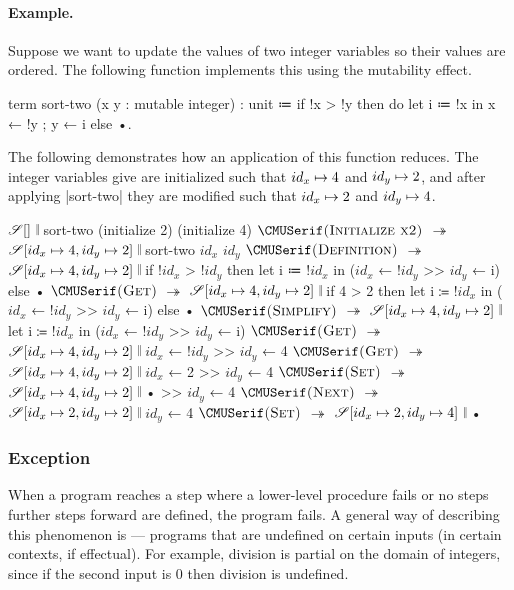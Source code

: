 \paragraph{Example.}
Suppose we want to update the values of two integer variables so their values are ordered.
The following function implements this using the mutability effect.
%
\begin{snippet}
term sort-two (x y : mutable integer) : unit
  ≔ if !x > !y
      then do
        { let i ≔ !x in
          x ← !y
        ; y ← i  }
      else •.
\end{snippet}
%
The following demonstrates how an application of this function reduces.
The integer variables give are initialized such that $id_x \mapsto 4$ and $id_y \mapsto 2$, and after applying \code|sort-two| they are modified such that $id_x \mapsto 2$ and $id_y \mapsto 4$.
%
\begin{snippet}
$\mathscr{S}[]$ 𝄁 sort-two (initialize 2) (initialize 4)
$\ruleapp{Initialize x2}$
$↠$ $\mathscr{S}[id_x \mapsto 4, id_y \mapsto 2]$ 𝄁 sort-two $id_x$ $id_y$
$\ruleapp{Definition}$
$↠$ $\mathscr{S}[id_x \mapsto 4, id_y \mapsto 2]$ 𝄁 if !$id_x$ > !$id_y$
                        then let i ≔ !$id_x$ in ($id_x$ ← !$id_y$ >> $id_y$ ← i)
                        else •
$\ruleapp{Get}$
$↠$ $\mathscr{S}[id_x \mapsto 4, id_y \mapsto 2]$ 𝄁 if 4 > 2
                        then let i ≔ !$id_x$ in ($id_x$ ← !$id_y$ >> $id_y$ ← i)
                        else •
$\ruleapp{Simplify}$
$↠$ $\mathscr{S}[id_x \mapsto 4, id_y \mapsto 2]$ 𝄁 let i ≔ !$id_x$ in ($id_x$ ← !$id_y$ >> $id_y$ ← i)
$\ruleapp{Get}$
$↠$ $\mathscr{S}[id_x \mapsto 4, id_y \mapsto 2]$ 𝄁 $id_x$ ← !$id_y$ >> $id_y$ ← 4
$\ruleapp{Get}$
$↠$ $\mathscr{S}[id_x \mapsto 4, id_y \mapsto 2]$ 𝄁 $id_x$ ← 2 >> $id_y$ ← 4
$\ruleapp{Set}$
$↠$ $\mathscr{S}[id_x \mapsto 4, id_y \mapsto 2]$ 𝄁 • >> $id_y$ ← 4
$\ruleapp{Next}$
$↠$ $\mathscr{S}[id_x \mapsto 2, id_y \mapsto 2]$ 𝄁 $id_y$ ← 4
$\ruleapp{Set}$
$↠$ $\mathscr{S}[id_x \mapsto 2, id_y \mapsto 4]$ 𝄁 •
\end{snippet}

\subsubsection{Exception}

When a program reaches a step where a lower-level procedure fails or no steps further steps forward are defined, the program fails. A general way of describing this phenomenon is  --- programs that are undefined on certain inputs (in certain contexts, if effectual). For example, division is partial on the domain of integers, since if the second input is 0 then division is undefined.

